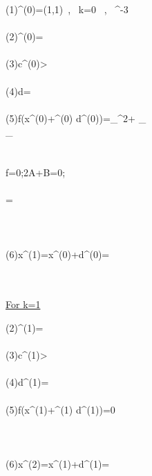 \documentclass[]{report}
\begin{document}
\begin{program}
\left(1\right)\quad {}^{(0)}=\left(1,1\right)\ , \, k=0 \ , \ ^{-3}\\~ \\
\left(2\right)\quad {}^{(0)}=\left[22.4599 \ , \ 42.008\right]\\~  \\
\left(3\right)\quad \lvert \mathbf c^{(0)}>\epsilon\\~  \\
\left(4\right)\quad \mathbf d=\left[1.7321-24.192x_1 \ , \ 1-43.008x_2\right]\\~  \\
\left(5\right)\quad f\left(\mathbf x^{(0)}+\alpha^{(0)} \mathbf d^{(0)}\right)=_{}\alpha^2+ _{}\alpha\\\quad \quad \quad \quad \quad \quad \quad \quad \quad {}_{}\\~  \\
\\\quad \quad \quad \quad \quad \quad \quad \quad \quad \delta f=0;2A\alpha+B=0;\\~\\
\quad \quad \quad \quad \quad \quad \quad \quad \quad\Longrightarrow\alpha= \\~\\
\quad \quad \quad \quad \quad \quad \quad \quad \quad {}\\~\\
\left(6\right)\quad \mathbf x^{(1)}=\mathbf x^{(0)}+\mathbf d^{(0)}=\left[0.4215\ , \ -0.0819\right]\\~  \\
\end{program}~
\\
\underline{For k=1}
\begin{program}
\left(2\right)\quad {}^{(1)}=\left[8.4650\ , \ -4.5259\right]\\~  \\
\left(3\right)\quad \lvert \mathbf c^{(1)}>\epsilon\\~  \\
\left(4\right)\quad \mathbf d^{(1)}=\left[-8.4650\ , \ 4.5259\right]\\~  \\
\left(5\right)\quad \delta f\left(\mathbf x^{(1)}+\alpha^{(1)} \mathbf d^{(1)}\right)=0\\~  \\
\quad \quad \quad \quad \quad \quad \quad \quad \quad {}\\~\\
\left(6\right)\quad \mathbf x^{(2)}=\mathbf x^{(1)}+\mathbf d^{(1)}=\left[0.2265\ , \ 0.0222\right]
\end{program}
\end{document}
